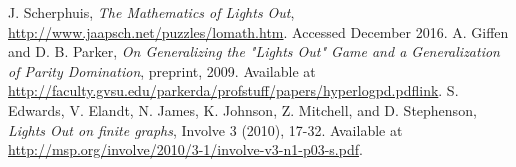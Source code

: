 \documentclass[11pt]{article}
\begin{document}
\begin{thebibliography}{9}
  J. Scherphuis, \textit{The Mathematics of Lights Out},
  \href{http://www.jaapsch.net/puzzles/lomath.htm}{http://www.jaapsch.net/puzzles/lomath.htm}.
  Accessed December 2016.
  A. Giffen and D. B. Parker, \textit{On Generalizing the "Lights Out" Game and a Generalization of Parity Domination}, preprint, 2009. Available at \href{http://faculty.gvsu.edu/parkerda/profstuff/papers/hyperlogpd.pdf}{http://faculty.gvsu.edu/parkerda/profstuff/papers/hyperlogpd.pdflink}.
  S. Edwards, V. Elandt, N. James, K. Johnson, Z. Mitchell, and D. Stephenson, \textit{Lights Out on finite graphs}, Involve 3 (2010), 17-32. Available at \href{http://msp.org/involve/2010/3-1/involve-v3-n1-p03-s.pdf}{http://msp.org/involve/2010/3-1/involve-v3-n1-p03-s.pdf}.
\end{thebibliography}
\end{document}
